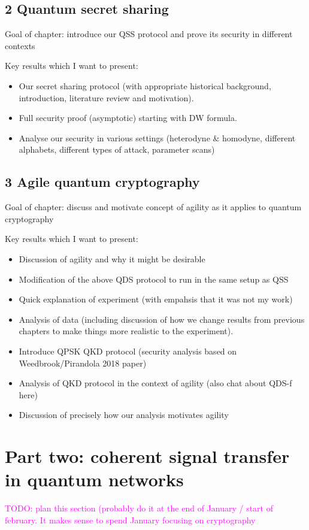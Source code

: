 \documentclass{article}
\def\MT #1{\textcolor{magenta}{#1}}
\begin{document}
\subsection*{2 Quantum secret sharing}
Goal of chapter: introduce our QSS protocol and prove its security in different contexts

Key results which I want to present:
\begin{itemize}
\item Our secret sharing protocol (with appropriate historical background, introduction, literature review and motivation). 
\item Full security proof (asymptotic) starting with DW formula.
\item Analyse our security in various settings (heterodyne \& homodyne, different alphabets, different types of attack, parameter scans)
\end{itemize}

\subsection*{3 Agile quantum cryptography}
Goal of chapter: discuss and motivate concept of agility as it applies to quantum cryptography

Key results which I want to present:
\begin{itemize}
\item Discussion of agility and why it might be desirable
\item Modification of the above QDS protocol to run in the same setup as QSS
\item Quick explanation of experiment (with empahsis that it was not my work)
\item Analysis of data (including discussion of how we change results from previous chapters to make things more realistic to the experiment). 
\item Introduce QPSK QKD protocol (security analysis based on Weedbrook/Pirandola 2018 paper)
\item Analysis of QKD protocol in the context of agility (also chat about QDS-f here)
\item Discussion of precisely how our analysis motivates agility
\end{itemize}


\section*{Part two: coherent signal transfer in quantum networks}
\MT{TODO: plan this section (probably do it at the end of January / start of february. It makes sense to spend January focusing on cryptography}
\end{document}

